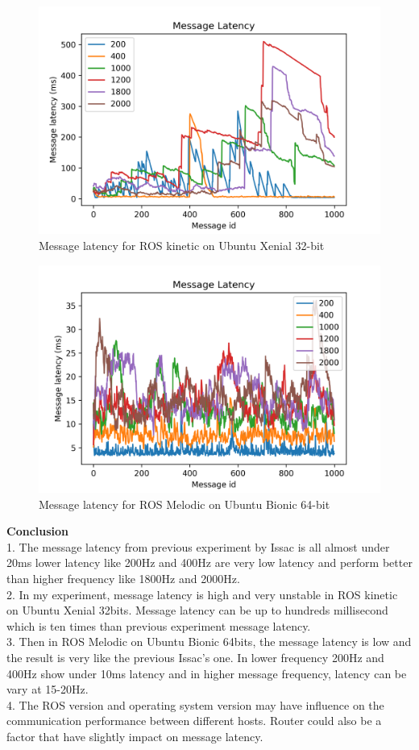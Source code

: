 \documentclass{mproj}
\begin{document}
\begin{figure}[h!]
\centering
\includegraphics[width = 1\textwidth]{ex1_res1.png}
\caption{Message latency for ROS kinetic on Ubuntu Xenial 32-bit}
\end{figure}
\begin{figure}[h!]
\centering
\includegraphics[width = 1\textwidth]{ex1_res2.png}
\caption{Message latency for ROS Melodic on Ubuntu Bionic 64-bit}
\end{figure}

\textbf{Conclusion} \\
1. The message latency from previous experiment by Issac is all almost under 20ms lower latency like 200Hz and 400Hz are very low latency and perform better than higher frequency like 1800Hz and 2000Hz. \\
2. In my experiment, message latency is high and very unstable in ROS kinetic on Ubuntu Xenial 32bits. Message latency can be up to hundreds millisecond which is ten times than previous experiment message latency.\\
3. Then in ROS Melodic on Ubuntu Bionic 64bits, the message latency is low and the result is very like the previous Issac's one. In lower frequency 200Hz and 400Hz show under 10ms latency and in higher message frequency, latency can be vary at 15-20Hz.\\
4. The ROS version and operating system version may have influence on the communication performance between different hosts. Router could also be a factor that have slightly impact on message latency.
\end{document}
